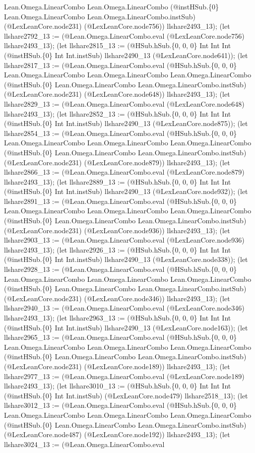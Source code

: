 \documentclass[11pt]{article}
\begin{document}
Lean.Omega.LinearCombo Lean.Omega.LinearCombo (@instHSub.\{0\} Lean.Omega.LinearCombo Lean.Omega.LinearCombo.instSub) (@LexLeanCore.node231) (@LexLeanCore.node756)) llshare2493\_13); (let llshare2792\_13 := (@Lean.Omega.LinearCombo.eval (@LexLeanCore.node756) llshare2493\_13); (let llshare2815\_13 := (@HSub.hSub.\{0, 0, 0\} Int Int Int (@instHSub.\{0\} Int Int.instSub) llshare2490\_13 (@LexLeanCore.node641)); (let llshare2817\_13 := (@Lean.Omega.LinearCombo.eval (@HSub.hSub.\{0, 0, 0\} Lean.Omega.LinearCombo Lean.Omega.LinearCombo Lean.Omega.LinearCombo (@instHSub.\{0\} Lean.Omega.LinearCombo Lean.Omega.LinearCombo.instSub) (@LexLeanCore.node231) (@LexLeanCore.node648)) llshare2493\_13); (let llshare2829\_13 := (@Lean.Omega.LinearCombo.eval (@LexLeanCore.node648) llshare2493\_13); (let llshare2852\_13 := (@HSub.hSub.\{0, 0, 0\} Int Int Int (@instHSub.\{0\} Int Int.instSub) llshare2490\_13 (@LexLeanCore.node875)); (let llshare2854\_13 := (@Lean.Omega.LinearCombo.eval (@HSub.hSub.\{0, 0, 0\} Lean.Omega.LinearCombo Lean.Omega.LinearCombo Lean.Omega.LinearCombo (@instHSub.\{0\} Lean.Omega.LinearCombo Lean.Omega.LinearCombo.instSub) (@LexLeanCore.node231) (@LexLeanCore.node879)) llshare2493\_13); (let llshare2866\_13 := (@Lean.Omega.LinearCombo.eval (@LexLeanCore.node879) llshare2493\_13); (let llshare2889\_13 := (@HSub.hSub.\{0, 0, 0\} Int Int Int (@instHSub.\{0\} Int Int.instSub) llshare2490\_13 (@LexLeanCore.node932)); (let llshare2891\_13 := (@Lean.Omega.LinearCombo.eval (@HSub.hSub.\{0, 0, 0\} Lean.Omega.LinearCombo Lean.Omega.LinearCombo Lean.Omega.LinearCombo (@instHSub.\{0\} Lean.Omega.LinearCombo Lean.Omega.LinearCombo.instSub) (@LexLeanCore.node231) (@LexLeanCore.node936)) llshare2493\_13); (let llshare2903\_13 := (@Lean.Omega.LinearCombo.eval (@LexLeanCore.node936) llshare2493\_13); (let llshare2926\_13 := (@HSub.hSub.\{0, 0, 0\} Int Int Int (@instHSub.\{0\} Int Int.instSub) llshare2490\_13 (@LexLeanCore.node338)); (let llshare2928\_13 := (@Lean.Omega.LinearCombo.eval (@HSub.hSub.\{0, 0, 0\} Lean.Omega.LinearCombo Lean.Omega.LinearCombo Lean.Omega.LinearCombo (@instHSub.\{0\} Lean.Omega.LinearCombo Lean.Omega.LinearCombo.instSub) (@LexLeanCore.node231) (@LexLeanCore.node346)) llshare2493\_13); (let llshare2940\_13 := (@Lean.Omega.LinearCombo.eval (@LexLeanCore.node346) llshare2493\_13); (let llshare2963\_13 := (@HSub.hSub.\{0, 0, 0\} Int Int Int (@instHSub.\{0\} Int Int.instSub) llshare2490\_13 (@LexLeanCore.node163)); (let llshare2965\_13 := (@Lean.Omega.LinearCombo.eval (@HSub.hSub.\{0, 0, 0\} Lean.Omega.LinearCombo Lean.Omega.LinearCombo Lean.Omega.LinearCombo (@instHSub.\{0\} Lean.Omega.LinearCombo Lean.Omega.LinearCombo.instSub) (@LexLeanCore.node231) (@LexLeanCore.node189)) llshare2493\_13); (let llshare2977\_13 := (@Lean.Omega.LinearCombo.eval (@LexLeanCore.node189) llshare2493\_13); (let llshare3010\_13 := (@HSub.hSub.\{0, 0, 0\} Int Int Int (@instHSub.\{0\} Int Int.instSub) (@LexLeanCore.node479) llshare2518\_13); (let llshare3012\_13 := (@Lean.Omega.LinearCombo.eval (@HSub.hSub.\{0, 0, 0\} Lean.Omega.LinearCombo Lean.Omega.LinearCombo Lean.Omega.LinearCombo (@instHSub.\{0\} Lean.Omega.LinearCombo Lean.Omega.LinearCombo.instSub) (@LexLeanCore.node487) (@LexLeanCore.node192)) llshare2493\_13); (let llshare3024\_13 := (@Lean.Omega.LinearCombo.eval 
\end{document}
